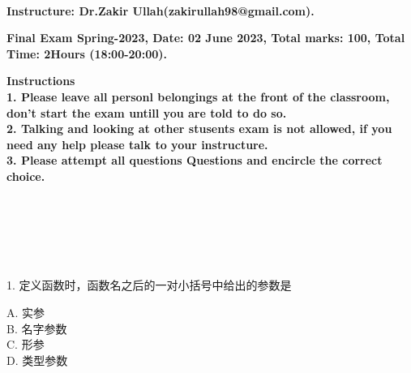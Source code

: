 \documentclass[6pt]{article}
\begin{document}
\large
\begin{center}
\\
\vspace{40pt}
\bf Instructure: Dr.Zakir Ullah(zakirullah98@gmail.com).\\
\vspace{40pt}
\end       {center}

\vspace{40pt}
\begin{center}

\bf Final Exam Spring-2023, Date: 02 June 2023, Total marks: 100,  Total Time: 2Hours (18:00-20:00).
\end{center}
\vspace{5pt}
\vspace{40pt}


\large
\bf Instructions \\
\small
1. Please leave all personl belongings at the front of the classroom, don't  start the exam untill you are told to do so.\\
2. Talking and looking at other stusents  exam is not allowed, if you need any help please talk to your  instructure.\\
3. Please attempt all questions Questions and  encircle the correct choice.\\
\large
\vspace{20pt}




\\
\vspace{20pt}

\\
\vspace{20pt}

\\

\vspace{300pt}

1. 定义函数时，函数名之后的一对小括号中给出的参数是\\

\begin{flushleft}
A. 实参  \\
B. 名字参数  \\
C. 形参  \\
D. 类型参数\\
\end{flushleft}
\end{document}

